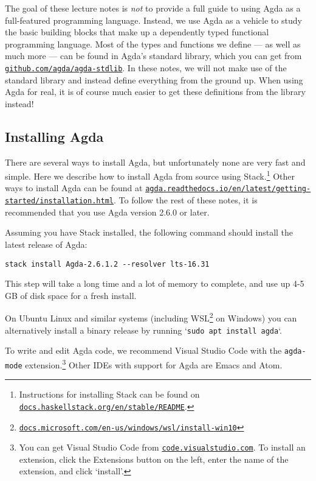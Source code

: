 \documentclass[a4paper,UKenglish]{tufte-handout}
\newcommand{\hrefu}[2]{\href{#1}{\nolinkurl{#2}}}
\theoremstyle{definition}
\begin{document}
The goal of these lecture notes is \emph{not} to provide a full guide to using
Agda as a full-featured programming language. Instead, we use Agda as a vehicle
to study the basic building blocks that make up a dependently typed functional
programming language. Most of the types and functions we define --- as well as
much more --- can be found in Agda's standard library, which you can get from
\hrefu{https://github.com/agda/agda-stdlib}{github.com/agda/agda-stdlib}. In
these notes, we will not make use of the standard library and instead define
everything from the ground up. When using Agda for real, it is of course
much easier to get these definitions from the library instead!


\subsection{Installing Agda}

There are several ways to install Agda, but unfortunately none are
very fast and simple. Here we describe how to install Agda from source
using Stack.\footnote{Instructions for installing Stack can be found
on \hrefu{https://docs.haskellstack.org/en/stable/README/}{docs.haskellstack.org/en/stable/README}.} Other ways
to install Agda can be found at
\hrefu{https://agda.readthedocs.io/en/latest/getting-started/installation.html}{agda.readthedocs.io/en/latest/getting-started/installation.html}.
To follow the rest of these notes, it is recommended that you use
Agda version 2.6.0 or later.

Assuming you have Stack installed, the following command should install the
latest release of Agda:
\begin{verbatim}
stack install Agda-2.6.1.2 --resolver lts-16.31
\end{verbatim}
This step will take a long time and a lot of memory to complete, and
use up 4-5 GB of disk space for a fresh install.

On Ubuntu Linux and similar systems (including
WSL\footnote{\hrefu{https://docs.microsoft.com/en-us/windows/wsl/install-win10}{docs.microsoft.com/en-us/windows/wsl/install-win10}}
on Windows) you can alternatively install a binary release by running
`\texttt{sudo apt install agda}`.

To write and edit Agda code, we recommend Visual Studio Code with the
\texttt{agda-mode} extension.\footnote{You can get Visual Studio Code
from \hrefu{https://code.visualstudio.com/}{code.visualstudio.com}. To install an extension,
click the Extensions button on the left, enter the name of the
extension, and click `install'.} Other IDEs with support for Agda are
Emacs and Atom.
\end{document}
